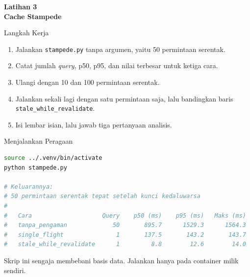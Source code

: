 \documentclass[aspectratio=169, table, 12pt]{beamer}
\begin{document}
\begin{frame}{\hfill}
  \centering
  \Huge{\textbf{Latihan 3\\Cache Stampede}}
\end{frame}

\begin{frame}{{\Large Langkah Kerja}}
  \vspace{6pt}
  \begin{enumerate}
    \item Jalankan \texttt{stampede.py} tanpa argumen, yaitu 50 permintaan
          serentak.
    \item Catat jumlah \textit{query}, p50, p95, dan nilai terbesar untuk ketiga cara.
    \item Ulangi dengan 10 dan 100 permintaan serentak.
    \item Jalankan sekali lagi dengan satu permintaan saja, lalu bandingkan
          baris \texttt{stale\_while\_revalidate}.
    \item Isi lembar isian, lalu jawab tiga pertanyaan analisis.
  \end{enumerate}
\end{frame}

\begin{frame}[fragile]{{\Large Menjalankan Peragaan}}
  \vspace{4pt}
\begin{lstlisting}[language=bash]
source ../.venv/bin/activate
python stampede.py

# Keluarannya:
# 50 permintaan serentak tepat setelah kunci kedaluwarsa
#
#   Cara                    Query    p50 (ms)    p95 (ms)   Maks (ms)
#   tanpa_pengaman             50       895.7      1529.3      1564.3
#   single_flight               1       137.5       143.2       143.7
#   stale_while_revalidate      1         8.8        12.6        14.0
\end{lstlisting}

  \vspace{4pt}
  {\footnotesize Skrip ini sengaja membebani basis data. Jalankan hanya pada
  container milik sendiri.}
\end{frame}
\end{document}
